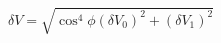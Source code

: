 \begin{equation}
\label{eq:delta_V_Malus}
\delta V = \sqrt{ \cos^4{\phi}(\delta V_0)^2 + (\delta V_1)^2}
\end{equation}